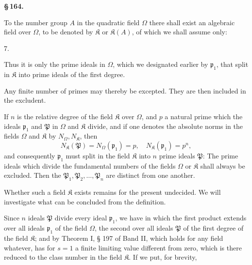 
\begin{center}
\textbf{\S\,164.\qquad {}}
\end{center}

To the number group $A$ in the quadratic field $\Omega$ there shall exist an algebraic field over $\Omega$, to be denoted by $\mathfrak{K}$ or $\mathfrak{K}(A)$, of which we shall assume only:

7. 


Thus it is only the prime ideals in $\Omega$, which we designated earlier by $\mathfrak{p}_1$, that split in $\mathfrak{K}$ into prime ideals of the first degree.

Any finite number of primes may thereby be excepted. They are then included in the excludent.

If $n$ is the relative degree of the field $\mathfrak{K}$ over $\Omega$, and $p$ a natural prime which the ideals $\mathfrak{p}_1$ and $\mathfrak{P}$ in $\Omega$ and $\mathfrak{K}$ divide, and if one denotes the absolute norms in the fields $\Omega$ and $\mathfrak{K}$ by $N_\Omega, N_\mathfrak{K}$, then
\[
N_\mathfrak{K}(\mathfrak{P}) = N_\Omega(\mathfrak{p}_1) = p, \quad N_\mathfrak{K}(\mathfrak{p}_1) = p^n,
\]
and consequently $\mathfrak{p}_1$ must split in the field $\mathfrak{K}$ into $n$ prime ideals $\mathfrak{P}$:
The prime ideals which divide the fundamental numbers of the fields $\Omega$ or $\mathfrak{K}$ shall always be excluded. Then the $\mathfrak{P}_1, \mathfrak{P}_2, \ldots, \mathfrak{P}_n$ are distinct from one another.

Whether such a field $\mathfrak{K}$ exists remains for the present undecided. We will investigate what can be concluded from the definition.

Since $n$ ideals $\mathfrak{P}$ divide every ideal $\mathfrak{p}_1$, we have
in which the first product extends over all ideals $\mathfrak{p}_1$ of the field $\Omega$, the second over all ideals $\mathfrak{P}$ of the first degree of the field $\mathfrak{K}$; and by Theorem I, § 197 of Band II, which holds for any field whatever,
has for $s=1$ a finite limiting value different from zero, which is there reduced to the class number in the field $\mathfrak{K}$. If we put, for brevity,
